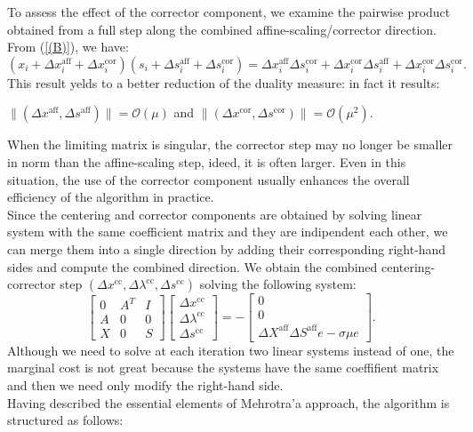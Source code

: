 \documentclass[a4paper,10 pt,titlepage,twoside]{book}
\theoremstyle{plain}
\theoremstyle{definition}
\theoremstyle{remark}
\begin{document}
To assess the effect of the corrector component, we examine the pairwise product obtained from a full step along the combined affine-scaling/corrector direction. From (\ref{(B)}), we have:
\begin{equation*}
(x_{i}+\Delta x_{i}^{\text{aff}}+\Delta x_{i}^{\text{cor}})(s_{i}+\Delta s_{i}^{\text{aff}}+\Delta s_{i}^{\text{cor}})= \Delta x_{i}^{\text{aff}}\Delta s_{i}^{\text{cor}}+\Delta x_{i}^{\text{cor}}\Delta s_{i}^{\text{aff}}+\Delta x_{i}^{\text{cor}}\Delta s_{i}^{\text{cor}}.
\end{equation*}
This result yelds to a better reduction of the duality measure: in fact it results:
\begin{center} 
$\lVert(\Delta x^{\text{aff}},\Delta s^{\text{aff}}) \rVert = \mathcal{O}(\mu)$ and $\lVert(\Delta x^{\text{cor}},\Delta s^{\text{cor}}) \rVert = \mathcal{O}(\mu^{2})$.
\end{center}
When the limiting matrix is singular, the corrector step may no longer be smaller in norm than the affine-scaling step, ideed, it is often larger. Even in this situation, the use of the corrector component usually enhances the overall efficiency of the algorithm in practice.\\
Since the centering and corrector components are obtained by solving linear system with the same coefficient matrix and they are indipendent each other, we can merge them into a single direction by adding their corresponding right-hand sides and compute the combined direction. 
We obtain the combined centering-corrector step $(\Delta x^{\text{cc}}, \Delta \lambda^{\text{cc}}, \Delta s^{\text{cc}})$ solving the following system:
\begin{equation}\label{(C)}
\begin{bmatrix}
0&A^{T}&I \\A&0&0\\X&0&S
\end{bmatrix}\begin{bmatrix}
\Delta x^{\text{cc}}\\\Delta\lambda^{\text{cc}} \\\Delta s^{\text{cc}}
\end{bmatrix}=-\begin{bmatrix}
0\\0\\\Delta X^{\text{aff}}\Delta S^{\text{aff}}e - \sigma\mu e
\end{bmatrix}.
\end{equation}
Although we need to solve at each iteration two linear systems instead of one, the marginal cost is not great because the systems have the same coeffifient matrix and then we need only modify the right-hand side. \\
 Having described the essential elements of Mehrotra'a approach, the algorithm is structured as follows:
\\
\end{document}
